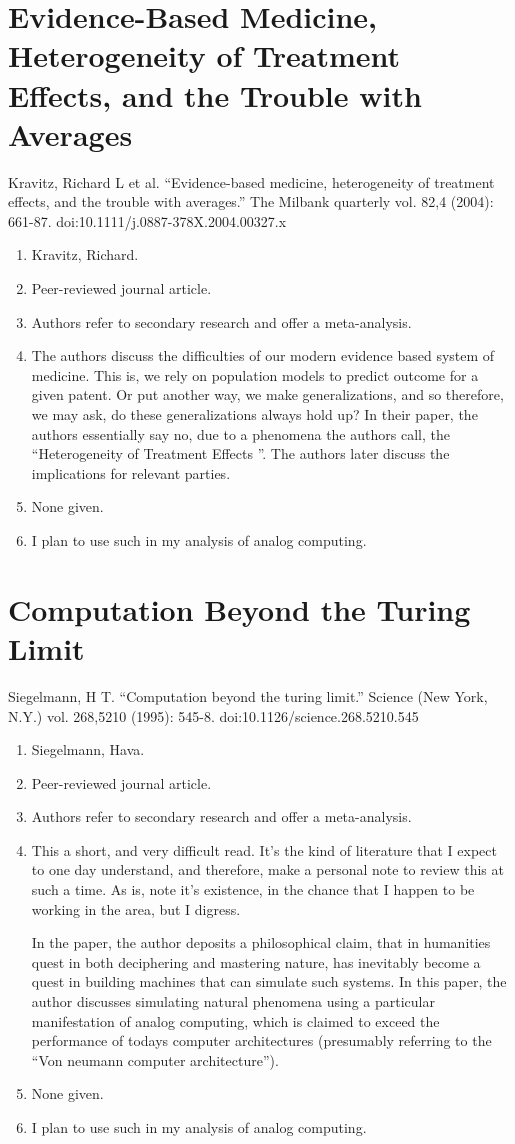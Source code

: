 \section*{Evidence-Based Medicine, Heterogeneity of Treatment Effects, and the Trouble with Averages}
Kravitz, Richard L et al. “Evidence-based medicine, heterogeneity of treatment effects, and the trouble with averages.” The Milbank quarterly vol. 82,4 (2004): 661-87. doi:10.1111/j.0887-378X.2004.00327.x
\begin{enumerate}
    \item Kravitz, Richard.
    \item Peer-reviewed journal article.
    \item Authors refer to secondary research and offer a meta-analysis.
    \item The authors discuss the difficulties of our modern evidence based system of medicine. This is, we rely on population models to predict outcome for a given patent. Or put another way, we make generalizations, and so therefore, we may ask, do these generalizations always hold up? In their paper, the authors essentially say no, due to a phenomena the authors call, the ``Heterogeneity of Treatment Effects ''. The authors later discuss the implications for relevant parties. 
    \item None given. 
    \item I plan to use such in my analysis of analog computing. 
\end{enumerate}

\section*{Computation Beyond the Turing Limit}
Siegelmann, H T. “Computation beyond the turing limit.” Science (New York, N.Y.) vol. 268,5210 (1995): 545-8. doi:10.1126/science.268.5210.545
\begin{enumerate}
    \item Siegelmann, Hava.
    \item Peer-reviewed journal article.
    \item Authors refer to secondary research and offer a meta-analysis.
    \item This a short, and very difficult read. It's the kind of literature that I expect to one day understand, and therefore, make a personal note to review this at such a time. As is, note it's existence, in the chance that I happen to be working in the area, but I digress.
    
    In the paper, the author deposits a philosophical claim, that in humanities quest in both deciphering and mastering nature, has inevitably become a quest in building machines that can simulate such systems. In this paper, the author discusses simulating natural phenomena using a particular manifestation of analog computing, which is claimed to exceed the performance of todays computer architectures (presumably referring to the ``Von neumann computer architecture''). 
    \item None given. 
    \item I plan to use such in my analysis of analog computing. 
\end{enumerate}



